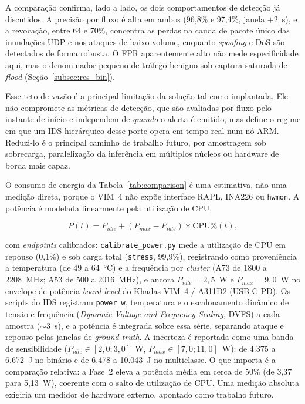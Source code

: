 \documentclass[12pt]{article}
\begin{document}
A comparação confirma, lado a lado, os dois comportamentos de detecção já
discutidos. A precisão por fluxo é alta em ambos (96,8\% e 97,4\%, janela $+2$~s),
e a revocação, entre 64 e 70\%, concentra as perdas na cauda de pacote único das
inundações UDP e nos ataques de baixo volume, enquanto \textit{spoofing} e DoS são
detectados de forma robusta. O FPR aparentemente alto não mede especificidade
aqui, mas o denominador pequeno de tráfego benigno sob captura saturada de
\textit{flood} (Seção~\ref{subsec:res_bin}).

Esse teto de vazão é a principal limitação da solução tal como implantada. Ele não
compromete as métricas de detecção, que são avaliadas por fluxo pelo instante de
início e independem de \emph{quando} o alerta é emitido, mas define o regime em
que um IDS hierárquico desse porte opera em tempo real num nó ARM. Reduzi-lo é o
principal caminho de trabalho futuro, por amostragem sob sobrecarga, paralelização
da inferência em múltiplos núcleos ou hardware de borda mais capaz.

O consumo de energia da Tabela~\ref{tab:comparison} é uma estimativa, não uma
medição direta, porque o VIM~4 não expõe interface RAPL, INA226 ou
\texttt{hwmon}. A potência é modelada linearmente pela utilização de CPU,

\begin{equation}
P(t) = P_{idle} + (P_{max} - P_{idle}) \times \text{CPU\%}(t),
\label{eq:power}
\end{equation}

com \textit{endpoints} calibrados: \texttt{calibrate\_power.py} mede a utilização
de CPU em repouso (0,1\%) e sob carga total (\texttt{stress}, 99,9\%),
registrando como proveniência a temperatura (de 49 a 64~°C) e a frequência por
\textit{cluster} (A73 de 1800 a 2208~MHz; A53 de 500 a 2016~MHz), e ancora
$P_{idle} = 2{,}5$~W e $P_{max} = 9{,}0$~W no envelope de potência
\textit{board-level} do Khadas VIM~4 / A311D2 (USB-C PD). Os scripts do IDS
registram \texttt{power\_w}, temperatura e o escalonamento dinâmico de tensão e
frequência (\textit{Dynamic Voltage and Frequency Scaling}, DVFS) a cada amostra
($\sim$3~s), e a potência é integrada sobre essa série, separando ataque e
repouso pelas janelas de \textit{ground truth}. A incerteza é reportada como uma
banda de sensibilidade ($P_{idle} \in [2{,}0;3{,}0]$~W, $P_{max} \in
[7{,}0;11{,}0]$~W): de 4.375 a 6.672~J no binário e de 6.478 a 10.043~J no
multiclasse. O que importa é a comparação relativa: a Fase~2 eleva a potência
média em cerca de 50\% (de 3,37 para 5,13~W), coerente com o salto de utilização
de CPU. Uma medição absoluta exigiria um medidor de hardware externo, apontado
como trabalho futuro.
\end{document}
